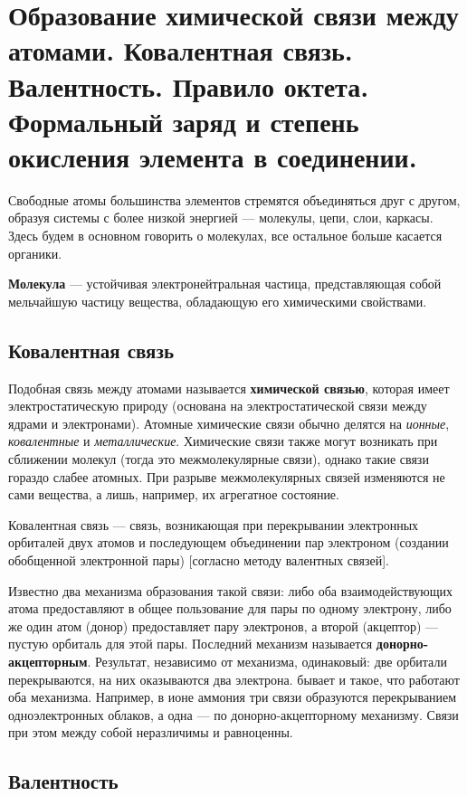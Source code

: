 \section{Образование химической связи между атомами. Ковалентная связь. Валентность. Правило октета. Формальный заряд и степень окисления элемента в соединении.}

Свободные атомы большинства элементов стремятся объединяться друг с другом, образуя системы с более низкой энергией — молекулы, цепи, слои, каркасы. Здесь будем в основном говорить о молекулах, все остальное больше касается органики.

\textbf{Молекула} --- устойчивая электронейтральная частица, представляющая собой мельчайшую частицу вещества, обладающую его химическими свойствами.

\subsection{Ковалентная связь}

Подобная связь между атомами называется \textbf{химической связью}, которая имеет электростатическую природу (основана на электростатической связи между ядрами и электронами). Атомные химические связи обычно делятся на \textit{ионные}, \textit{ковалентные} и \textit{металлические}. Химические связи также могут возникать при сближении молекул (тогда это межмолекулярные связи), однако такие связи гораздо слабее атомных. При разрыве межмолекулярных связей изменяются не сами вещества, а лишь, например, их агрегатное состояние.

Ковалентная связь --- связь, возникающая при перекрывании электронных орбиталей двух атомов и последующем объединении пар электроном (создании обобщенной электронной пары) [согласно методу валентных связей].

Известно два механизма образования такой связи: либо оба взаимодействующих атома предоставляют в общее пользование для пары по одному электрону, либо же один атом (донор) предоставляет пару электронов, а второй (акцептор) --- пустую орбиталь для этой пары. Последний механизм называется \textbf{донорно-акцепторным}. Результат, независимо от механизма, одинаковый: две орбитали перекрываются, на них оказываются два электрона. бывает и такое, что работают оба механизма. Например, в ионе аммония  три связи образуются перекрыванием одноэлектронных облаков, а одна --- по донорно-акцепторному механизму. Связи при этом между собой неразличимы и равноценны.

\subsection{Валентность}

